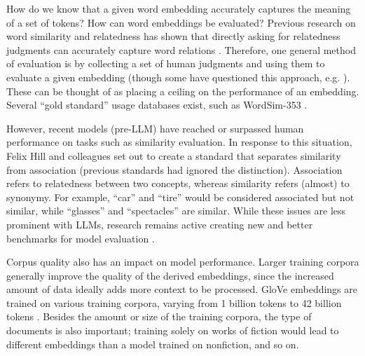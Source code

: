 
How do we know that a given word embedding accurately captures the meaning of a set of tokens? How can word embeddings be evaluated? Previous research on word similarity and relatedness has shown that directly asking for relatedness judgments can accurately capture word relations \cite{finkelstein2001placing}. Therefore, one general method of evaluation is by collecting a set of human judgments and using them to evaluate a given embedding (though some have questioned this approach, e.g. \cite{richie2022inter}). These can be thought of as placing a ceiling on the performance of an embedding. Several ``gold standard'' usage databases exist, such as WordSim-353 \cite{finkelstein2001placing, agirre2009study}.

However, recent models (pre-LLM) have reached or surpassed human performance on tasks such as similarity evaluation. In response to this situation, Felix Hill and colleagues \cite{hill2015simlex} set out to create a standard that separates similarity from association (previous standards had ignored the distinction). Association refers to relatedness between two concepts, whereas similarity refers (almost) to synonymy. For example, ``car'' and ``tire'' would be considered associated but not similar, while ``glasses'' and ``spectacles'' are similar. While these issues are less prominent with LLMs, research remains active creating new and better benchmarks for model evaluation \cite{bugliarello2023measuring}.

Corpus quality also has an impact on model performance. Larger training corpora generally improve the quality of the derived embeddings, since the increased amount of data ideally adds more context to be processed. GloVe embeddings are trained on various training corpora, varying from 1 billion tokens to 42 billion tokens \cite{pennington2014glove}. Besides the amount or size of the training corpora, the type of documents is also important; training solely on works of fiction would lead to different embeddings than a model trained on nonfiction, and so on.


